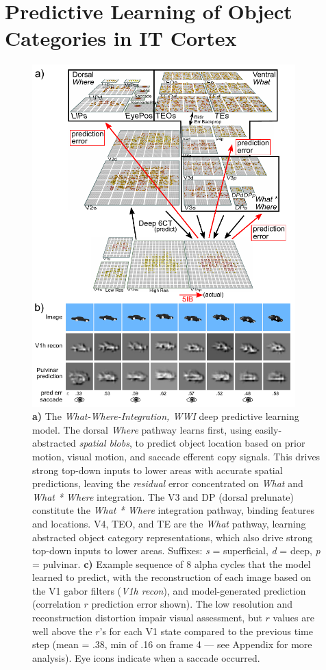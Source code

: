 \documentclass[11pt,twoside]{article}
\newif\myifpdf
\begin{document}
\section{Predictive Learning of Object Categories in IT Cortex}

\begin{figure}
  \centering\includegraphics[width=4in]{fig_deepleabra_wwi_ab_pred_model_frames}
  \caption{\footnotesize {\bf a)} The \emph{What-Where-Integration, WWI} deep predictive learning model. The dorsal \emph{Where} pathway learns first, using easily-abstracted \emph{spatial blobs}, to predict object location based on prior motion, visual motion, and saccade efferent copy signals.  This drives strong top-down inputs to lower areas with accurate spatial predictions, leaving the \emph{residual} error concentrated on \emph{What} and \emph{What * Where} integration.  The V3 and DP (dorsal prelunate) constitute the \emph{What * Where} integration pathway, binding features and locations.  V4, TEO, and TE are the \emph{What} pathway, learning abstracted object category representations, which also drive strong top-down inputs to lower areas.  Suffixes: \emph{s} = superficial, \emph{d} = deep, \emph{p} = pulvinar. {\bf c)} Example sequence of 8 alpha cycles that the model learned to predict, with the reconstruction of each image based on the V1 gabor filters (\emph{V1h recon}), and model-generated prediction (correlation $r$ prediction error shown).  The low resolution and reconstruction distortion impair visual assessment, but $r$ values are well above the $r$'s for each V1 state compared to the previous time step (mean = .38, min of .16 on frame 4 --- see Appendix for more analysis).  Eye icons indicate when a saccade occurred.}
  \label{fig.model}
\end{figure}
\end{document}
